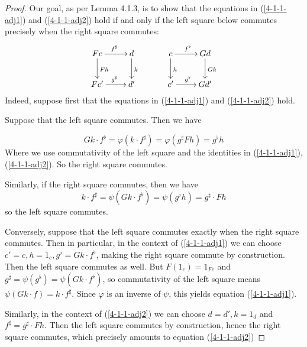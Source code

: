 \documentclass[../../solutions]{subfiles}
\begin{document}
\begin{proof}
Our goal, as per Lemma 4.1.3, is to show that the equations in (\ref{4-1-1-adj1}) and (\ref{4-1-1-adj2}) hold if and only if the left square below commutes precisely when the right square commutes:
\[
\xymatrix{
 Fc\ar[d]^{Fh} \ar[r]^{f^\sharp} & d \ar[d]^{k}\\
 Fc'\ar[r]^{g^\sharp} & d'
} \ \ \ \ \ \ \ \ \ 
\xymatrix{
 c\ar[d]^{h} \ar[r]^{f^\flat} & Gd \ar[d]^{Gk}\\
 c'\ar[r]^{g^\flat} & Gd'
} 
\]
Indeed, suppose first that the equations in (\ref{4-1-1-adj1}) and (\ref{4-1-1-adj2}) hold.

Suppose that the left square commutes. Then we have

\[
Gk \cdot f^\flat = \varphi(k \cdot f^\sharp) = \varphi(g^\sharp Fh) = g^\flat h 
\]
Where we use commutativity of the left square and the identities in (\ref{4-1-1-adj1}), (\ref{4-1-1-adj2}). So the right square commutes. 

Similarly, if the right square commutes, then we have
\[
k \cdot f^\sharp = \psi(Gk \cdot f^\flat) = \psi (g^\flat h) = g^\sharp \cdot Fh
\]
so the left square commutes.

Conversely, suppose that the left square commutes exactly when the right square commutes. Then in particular, in the context of (\ref{4-1-1-adj1}) we can choose $c' = c, h = 1_{c}, g^\flat =Gk \cdot f^\flat$, making the right square commute by construction. Then the left square commutes as well. But $F(1_c)=1_{Fc}$ and $g^\sharp = \psi(g^\flat)=\psi(Gk\cdot f^\flat)$, so commutativity of the left square means $\psi(Gk\cdot f) = k\cdot f^\sharp$. Since $\varphi$ is an inverse of $\psi$, this yields equation (\ref{4-1-1-adj1}). 

Similarly, in the context of (\ref{4-1-1-adj2}) we can choose $d = d', k = 1_d$ and $f^\sharp = g^\sharp \cdot Fh$. Then the left square commutes by construction, hence the right square commutes, which precisely amounts to equation (\ref{4-1-1-adj2})
\end{proof}
\end{document}

